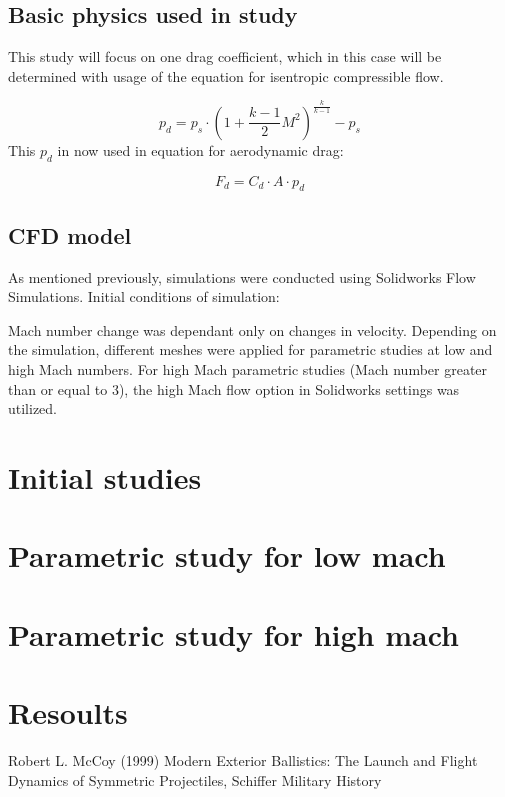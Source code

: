 \documentclass{article}
\begin{document}
	\subsection{Basic physics used in study}
		This study will focus on one drag coefficient, which in this case will be determined with usage of the equation for isentropic compressible 					flow.
		
		\begin{equation}
		p_d = p_s\cdot (1 + \frac{k-1}{2}M^2)^{\frac{k}{k-1}}-p_s
		\end{equation}
		This $p_d$ in now used in equation for aerodynamic drag:
		
		\begin{equation}
		F_d = C_d \cdot A \cdot p_d
		\end{equation}

	\subsection{CFD model}
	\begin{comment}
	Like mentioned already, simulations were conducted in Solidworks Flow Simulations. Initial conditions were: Mach number was changed by velocity 				changes. Depending on simulation, different meshes were used for low mach and high mach parametric studies. For the high mach parametric study(>=3 		mach flow) high mach flow option was used in Solidworks settings. 
	\end{comment}
As mentioned previously, simulations were conducted using Solidworks Flow Simulations. Initial conditions of simulation:

Mach number change was dependant only on changes in velocity. Depending on the simulation, different meshes were applied for parametric studies at low and high Mach numbers. For high Mach parametric studies (Mach number greater than or equal to 3), the high Mach flow option in Solidworks settings was utilized.


\section{Initial studies}

\section{Parametric study for low mach}

\section{Parametric study for high mach}

\section{Resoults}

\begin{thebibliography}{9}
	Robert L. McCoy (1999) Modern Exterior Ballistics: The Launch and Flight Dynamics of Symmetric Projectiles, Schiffer Military History
\end{thebibliography}
\end{document}
